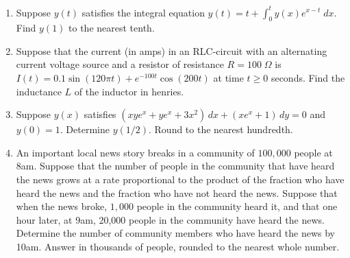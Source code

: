 \documentclass{ximera}
\begin{document}
\begin{enumerate}[label=(\arabic*)]

\item    Suppose $y(t)$ satisfies the integral equation $\displaystyle y(t)=t+\int_0^t y(x)e^{x-t}\; dx$. Find $y(1)$ to the nearest tenth.






 \item Suppose that the current (in amps) in an RLC-circuit with an alternating current voltage source and a resistor of resistance $R=100\;\Omega$ is $I(t)=0.1 \sin{(120\pi t)}+e^{-100t}\cos{(200t)}$ at time $t\geq 0$ seconds.  Find the inductance $L$ of the inductor in henries. 
 





\newpage

\item Suppose $y(x)$ satisfies $(xye^{x}+ye^{x}+3x^2)\,dx+(xe^{x}+1)\,dy=0$ and $y(0)=1$.  Determine $y(1/2)$.  Round to the nearest hundredth.





\item An important local news story breaks in a community of $100,000$ people at 8am.  Suppose that the number of people in the community that have heard the news grows at a rate proportional to the product of the fraction who have heard the news and the fraction who have not heard the news.  Suppose that when the news broke, $1,000$ people in the community heard it, and that one hour later, at 9am, 20,000 people in the community have heard the news.  Determine the number of community members who have heard the news by 10am.  Answer in thousands of people, rounded to the nearest whole number.


\end{enumerate}
\end{document}
